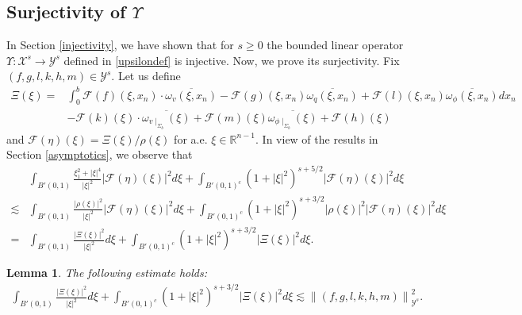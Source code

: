 \documentclass[11pt,letterpaper,reqno]{amsart}
\newtheorem{lemma}[theorem]{Lemma}
\numberwithin{equation}{section}
\newcommand{\abs}[1]{\left\lvert#1\right\rvert}
\newcommand{\norm}[1]{\left\lVert#1\right\rVert}
\begin{document}
\subsection{Surjectivity of \(\Upsilon\)}
In Section \ref{injectivity}, we have shown that for \(s \geq 0\) the bounded linear operator \(\Upsilon: \mathcal{X}^{s} \to \mathcal{Y}^{s}\) defined in \eqref{upsilondef} is injective. Now, we prove its surjectivity. Fix \((f,g,l,k,h,m) \in \mathcal{Y}^{s}\). Let us define
\begin{align}
    \Xi(\xi)=&\int_{0}^{b}\mathcal{F}(f)(\xi,x_{n})\cdot\overline{\omega_{v}(\xi,x_{n})}-\mathcal{F}(g)(\xi,x_{n})\overline{\omega_{q}(\xi,x_{n})}+\mathcal{F}(l)(\xi,x_{n})\overline{\omega_{\phi}(\xi,x_{n})}dx_{n}\nonumber \\
    &-\mathcal{F}(k)(\xi)\cdot\overline{\omega_{v\mid_{\Sigma_{b}}}(\xi)}+\mathcal{F}(m)(\xi)\overline{\omega_{\phi\mid_{\Sigma_{b}}}(\xi)}+\mathcal{F}(h)(\xi)
\end{align}
and \(\mathcal{F}(\eta)(\xi)=\Xi(\xi)/\rho(\xi)\) for a.e. \(\xi \in \mathbb{R}^{n-1}\).
In view of the results in Section \ref{asymptotics}, we observe that
\begin{align}
    &\int_{B'(0,1)}\frac{\xi_{1}^{2}+\abs{\xi}^{4}}{\abs{\xi}^{2}}\abs{\mathcal{F}(\eta)(\xi)}^{2}d\xi+\int_{B'(0,1)^{c}}(1+\abs{\xi}^{2})^{s+5/2}\abs{\mathcal{F}(\eta)(\xi)}^{2}d\xi \nonumber\\
    \lesssim&\int_{B'(0,1)}\frac{\abs{\rho(\xi)}^{2}}{\abs{\xi}^{2}}\abs{\mathcal{F}(\eta)(\xi)}^{2}d\xi+\int_{B'(0,1)^{c}}(1+\abs{\xi}^{2})^{s+3/2}\abs{\rho(\xi)}^{2}\abs{\mathcal{F}(\eta)(\xi)}^{2}d\xi \nonumber\\
    =&\int_{B'(0,1)}\frac{\abs{\Xi(\xi)}^{2}}{\abs{\xi}^{2}}d\xi+\int_{B'(0,1)^{c}}(1+\abs{\xi}^{2})^{s+3/2}\abs{\Xi(\xi)}^{2}d\xi.
\end{align}
\begin{lemma} \label{xiintestimate}
The following estimate holds:
    \begin{align}
        \int_{B'(0,1)}\frac{\abs{\Xi(\xi)}^{2}}{\abs{\xi}^{2}}d\xi+\int_{B'(0,1)^{c}}(1+\abs{\xi}^{2})^{s+3/2}\abs{\Xi(\xi)}^{2}d\xi\lesssim \norm{(f,g,l,k,h,m)}_{\mathcal{Y}^{s}}^{2}.
    \end{align}
\end{lemma}
\end{document}
